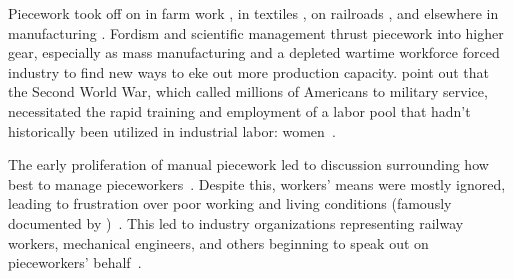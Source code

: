 \documentclass[trackingWork]{subfiles}
\begin{document}


Piecework took off on in farm work \cite{hughRaynbirdTaskWork},
in textiles \cite{restructuringPieceworkBaker,riisOtherSideLives},
on railroads \cite{Brown01041990}, and 
elsewhere in manufacturing \cite{10.2307/3827491}.
Fordism and scientific management thrust piecework into higher gear, especially as
mass manufacturing and
a depleted wartime workforce forced industry to find new ways to eke out more production capacity.
\citeauthor{hart2013rise} point out that the Second World War,
which called millions of Americans to military service,
necessitated the rapid training and employment of
a labor pool that hadn't historically been utilized in industrial labor: women~\cite{hart2013rise}.

The early proliferation of manual piecework led to discussion surrounding how best to manage pieceworkers~\cite{norton1900textile,clark1908cotton}.
Despite this, workers' means were mostly ignored,
leading to frustration over poor working and living conditions
(famously documented by
\citeauthor{riisOtherSideLives})~\cite{riisOtherSideLives}.
This led to industry organizations representing
railway workers, mechanical engineers, and others beginning to speak out on pieceworkers' behalf~\cite{american1921problem,richards1904anything}.
\end{document}
